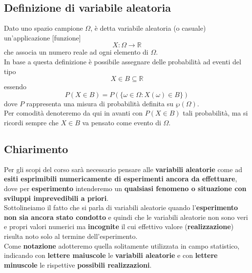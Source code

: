 \subsection{Definizione di variabile aleatoria}
Dato uno spazio campione $\Omega$, è detta variabile aleatoria (o casuale) un'applicazione [funzione] \[X: \Omega \rightarrow \mathbb{R}\] che associa un numero reale ad ogni elemento di $\Omega$. \\
In base a questa definizione è possibile assegnare delle probabilità ad eventi del tipo 
\[
X \in B \subseteq \mathbb{R}
\]
essendo
\[
P({X \in B}) = P(\{\omega \in \Omega: X(\omega) \in B\})
\]
dove $P$ rappresenta una misura di probabilità definita su $\wp(\Omega)$. \\
Per comodità denoteremo da qui in avanti con $P(X \in B)$ tali probabilità, ma si ricordi sempre che $X \in B$ va pensato come evento di $\Omega$.

\subsection{Chiarimento}
Per gli scopi del corso sarà necessario pensare alle \textbf{variabili aleatorie} come ad \textbf{esiti esprimibili numericamente di esperimenti ancora da effettuare}, dove per \textbf{esperimento} intenderemo un \textbf{qualsiasi fenomeno o situazione con sviluppi imprevedibili a priori}. \\
Sottolineiamo il fatto che si parla di variabili aleatorie quando l’\textbf{esperimento non sia ancora stato condotto }e quindi che le variabili aleatorie non sono veri e propri valori numerici ma \textbf{incognite }il cui effettivo valore (\textbf{realizzazione}) risulta noto solo al termine dell’esperimento. \\
Come \textbf{notazione }adotteremo quella solitamente utilizzata in campo statistico, indicando con \textbf{lettere maiuscole} le \textbf{variabili aleatorie} e con \textbf{lettere minuscole }le rispettive \textbf{possibili realizzazioni}.

